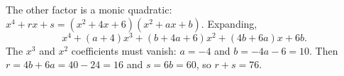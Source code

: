 The other factor is a monic quadratic: $x^4+rx+s=(x^2+4x+6)(x^2+ax+b)$. Expanding,
\[
x^4+(a+4)x^3+(b+4a+6)x^2+(4b+6a)x+6b .
\]
The $x^3$ and $x^2$ coefficients must vanish: $a=-4$ and $b=-4a-6=10$. Then $r=4b+6a=40-24=16$ and $s=6b=60$, so $r+s=\boxed{76}$.
